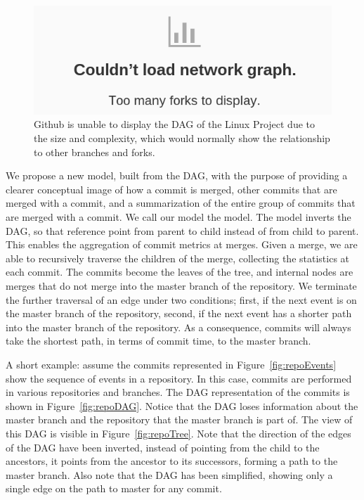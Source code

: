 \documentclass[conference, draftclsnofoot, draft]{IEEEtran}
\begin{document}
\begin{figure}
  \centering
  \includegraphics[width=0.8\linewidth]{figures/github_viewer.png}
  \caption{Github is unable to display the DAG of the Linux
    Project due to the size and complexity, which would normally
    show the relationship to other branches and forks.}
  \label{fig:gitfail}
\end{figure}


We propose a new model, built from the DAG, with the purpose of
providing a clearer conceptual image of how a commit is merged, other
commits that are merged with a commit, and a summarization of the entire
group of commits that are merged with a commit. We call our model the
\mt model. The model inverts the DAG, so that reference point from
parent to child instead of from child to parent. This enables the
aggregation of commit metrics at merges. Given a merge, we are able to
recursively traverse the children of the merge, collecting the
statistics at each commit. The commits become the leaves of the tree,
and internal nodes are merges that do not merge into the master branch
of the repository. We terminate the further traversal of an edge under
two conditions; first, if the next event is on the master branch of the
repository, second, if the next event has a shorter path into the master
branch of the repository. As a consequence, commits will always take the
shortest path, in terms of commit time, to the master branch.

A short example: assume the commits represented in
Figure~\ref{fig:repoEvents} show the sequence of events in a repository.
In this case, commits are performed in various repositories and
branches. The DAG representation of the commits is shown in
Figure~\ref{fig:repoDAG}. Notice that the DAG loses information about
the master branch and the repository that the master branch is part of.
The \mt view of this DAG is visible in Figure~\ref{fig:repoTree}.
Note that the direction of the edges of the DAG have been inverted,
instead of pointing from the child to the ancestors, it points from the
ancestor to its successors, forming a path to the master branch. Also
note that the DAG has been simplified, showing only a single edge on the
path to master for any commit.
\end{document}
